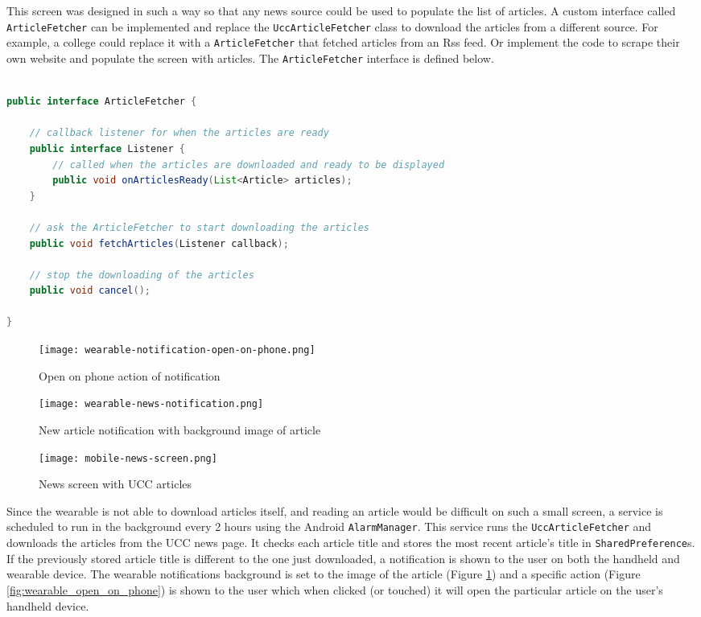 This screen was designed in such a way so that any news source could be used to
populate the list of articles. A custom interface called \texttt{ArticleFetcher}
can be implemented and replace the \texttt{UccArticleFetcher} class to download
the articles from a different source. For example, a college could replace it
with a \texttt{ArticleFetcher} that fetched articles from an Rss feed. Or
implement the code to scrape their own website and populate the screen with
articles. The \texttt{ArticleFetcher} interface is defined below.

\begin{lstlisting}[language=Java]

public interface ArticleFetcher {

    // callback listener for when the articles are ready
    public interface Listener {
        // called when the articles are downloaded and ready to be displayed
        public void onArticlesReady(List<Article> articles);
    }

    // ask the ArticleFetcher to start downloading the articles
    public void fetchArticles(Listener callback);

    // stop the downloading of the articles
    public void cancel();

}

\end{lstlisting}

\begin{figure}
    \centering
    \texttt{[image: wearable-notification-open-on-phone.png]}
    \caption{Open on phone action of notification}
    \label{fig:wearable_open_on_phone}
    \texttt{[image: wearable-news-notification.png]}
    \caption{New article notification with background image of article}
    \label{fig:wearable_news_notification}
\end{figure}

\begin{figure}
    \centering
    \texttt{[image: mobile-news-screen.png]}
    \caption{News screen with UCC articles}
    \label{fig:handheld_news_screen}
\end{figure}

Since the wearable is not able to download articles itself, and reading an
article would be difficult on such a small screen, a service is scheduled to
run in the background every 2 hours using the Android \texttt{AlarmManager}.
This service runs the \texttt{UccArticleFetcher} and downloads the articles
from the UCC news page. It checks each article title and stores the most recent
article's title in \texttt{SharedPreference}s. If the previously stored article
title is different to the one just downloaded, a notification is shown to the
user on both the handheld and wearable device. The wearable notifications
background is set to the image of the article
(Figure \ref{fig:wearable_news_notification}) and a specific action
(Figure \ref{fig:wearable_open_on_phone}) is shown
to the user which when clicked (or touched) it will open the particular article
on the user's handheld device.


